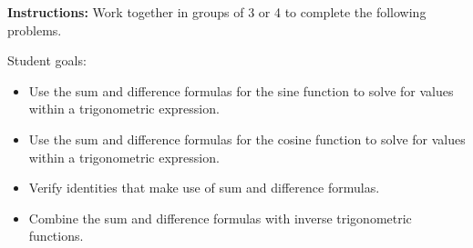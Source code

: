 

\noindent \textbf{Instructions:}  Work together in groups of  3 or 4
to complete the following problems.

Student goals:
\begin{itemize}
\item Use the sum and difference formulas for the sine function to
  solve for values within a trigonometric expression.
\item Use the sum and difference formulas for the cosine function to
  solve for values within a trigonometric expression.
\item Verify identities that make use of sum and difference formulas.
\item Combine the sum and difference formulas with inverse
  trigonometric functions.
\end{itemize}



